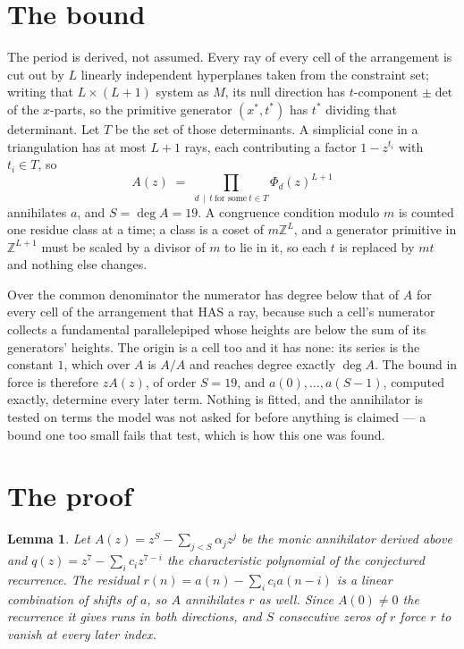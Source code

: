 \documentclass[11pt,a4paper]{article}
\theoremstyle{plain}
\newtheorem{lemma}[theorem]{Lemma}
\theoremstyle{definition}
\begin{document}
\section{The bound}

The period is derived, not assumed. Every ray of every cell of the arrangement is cut out by
$L$ linearly independent hyperplanes taken from the constraint set; writing that $L\times(L+1)$
system as $M$, its null direction has $t$-component $\pm\det$ of the $x$-parts, so the
primitive generator $(x^*,t^*)$ has $t^*$ dividing that determinant. Let $T$ be the set of
those determinants. A simplicial cone in a triangulation has at most $L+1$ rays, each
contributing a factor $1-z^{t_i}$ with $t_i\in T$, so
\[
A(z)\;=\;\prod_{d\,\mid\,t\ \text{for some}\ t\in T}\Phi_d(z)^{L+1}
\]
annihilates $a$, and $S=\deg A=19$. A congruence condition modulo $m$ is counted one residue
class at a time; a class is a coset of $m\mathbb{Z}^L$, and a generator primitive in
$\mathbb{Z}^{L+1}$ must be scaled by a divisor of $m$ to lie in it, so each $t$ is replaced
by $mt$ and nothing else changes.

Over the common denominator the numerator has degree below that of $A$ for every cell of the
arrangement that HAS a ray, because such a cell's numerator collects a fundamental
parallelepiped whose heights are below the sum of its generators' heights. The origin is a cell
too and it has none: its series is the constant $1$, which over $A$ is $A/A$ and reaches degree
exactly $\deg A$. The bound in force is therefore $zA(z)$, of order $S=19$, and
$a(0),\dots,a(S-1)$, computed exactly, determine every later term. Nothing is fitted, and the
annihilator is tested on terms the model was not asked for before anything is claimed --- a
bound one too small fails that test, which is how this one was found.

\section{The proof}

\begin{lemma}\label{lem:crit}
Let $A(z)=z^S-\sum_{j<S}\alpha_jz^{j}$ be the monic annihilator derived above and
$q(z)=z^{7}-\sum_ic_iz^{7-i}$ the characteristic polynomial of the conjectured
recurrence. The residual $r(n)=a(n)-\sum_ic_ia(n-i)$ is a linear combination of shifts of $a$,
so $A$ annihilates $r$ as well. Since $A(0)\ne0$ the recurrence it gives runs in both
directions, and $S$ consecutive zeros of $r$ force $r$ to vanish at every later index.
\end{lemma}
\end{document}

